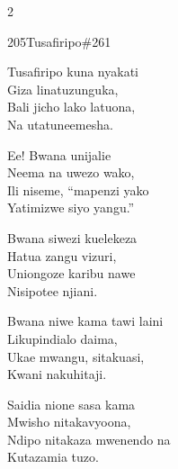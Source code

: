 \documentclass{article}
\begin{document}
\begin{multicols}{2}
\begin{hymn}{205}{Tusafiripo}{\#261}
\begin{stanza}
Tusafiripo kuna nyakati\\
Giza linatuzunguka,\\
Bali jicho lako latuona,\\
Na utatuneemesha.
\end{stanza}
\begin{chorus}
Ee! Bwana unijalie\\
Neema na uwezo wako,\\
Ili niseme, ``mapenzi yako\\
Yatimizwe siyo yangu.''
\end{chorus}
\begin{stanza}
Bwana siwezi kuelekeza\\
Hatua zangu vizuri,\\
Uniongoze karibu nawe\\
Nisipotee njiani.
\end{stanza}
\begin{stanza}
Bwana niwe kama tawi laini\\
Likupindialo daima,\\
Ukae mwangu, sitakuasi,\\
Kwani nakuhitaji.
\end{stanza}
\begin{stanza}
Saidia nione sasa kama\\
Mwisho nitakavyoona,\\
Ndipo nitakaza mwenendo na\\
Kutazamia tuzo.
\end{stanza}
\end{hymn}


\end{multicols}
\end{document}
